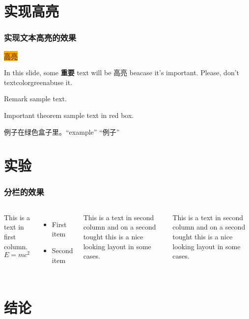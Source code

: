 \documentclass{beamer}
\begin{document}
\section{实现高亮}
\begin{frame}
\frametitle{实现文本高亮的效果}
\colorbox{orange}{高亮}

In this slide, some \textbf{重要} text will be \alert{高亮} beacase it's important. 
Please, don't textcolor{green}{abuse} it.

\begin{block}{Remark}
	sample text.
\end{block}

\begin{alertblock}{Important theorem}
	sample text in red box.
\end{alertblock}

\begin{examples}
	例子在绿色盒子里。``example'' “例子”
\end{examples}

\end{frame}

\section{实验}
\begin{frame}
\frametitle{分栏的效果}
\begin{columns}
	This is a text in first column.
	$$E=mc^2$$
	\begin{itemize}
	\item First item 
	\item Second item 
	\end{itemize}

	This is a text in second column 
	and on a second tought this is a nice looking
	layout in some cases. 
	
	This is a text in second column 
	and on a second tought this is a nice looking
	layout in some cases. 
\end{columns}
\end{frame}


\section{结论}
\end{document}
